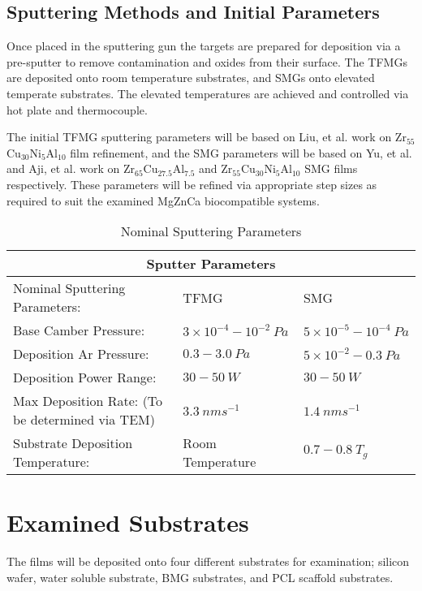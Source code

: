 \documentclass[draft,a4paper,12pt,oneside]{report}%
\begin{document}
\subsection{Sputtering Methods and Initial Parameters}
Once placed in the sputtering gun the targets are prepared for deposition via a pre-sputter to remove contamination and oxides from their surface. The TFMGs are deposited onto room temperature substrates, and SMGs onto elevated temperate substrates. The elevated temperatures are achieved and controlled via hot plate and thermocouple.

The initial TFMG sputtering parameters will be based on Liu, et al. \cite{Liu2012} work on Zr$_{55}$Cu$_{30}$Ni$_{5}$Al$_{10}$ film refinement, and the SMG parameters will be based on Yu, et al. \cite{Yu2013} and Aji, et al. \cite{Aji2013} work on Zr$_{65}$Cu$_{27.5}$Al$_{7.5}$ and Zr$_{55}$Cu$_{30}$Ni$_{5}$Al$_{10}$ SMG films respectively. These parameters will be refined via appropriate step sizes as required to suit the examined MgZnCa biocompatible systems. 

\begin{table}[h]
	\centering
	\begin{tabular}{ l l l }
		\toprule
		\multicolumn{3}{c}{Sputter Parameters}\\
		\midrule
		Nominal Sputtering Parameters: & TFMG & SMG \\
		\midrule
		Base Camber Pressure: & $3 \times 10^{-4} - 10^{-2}~ Pa$ & $5 \times 10^{-5} - 10^{-4}~ Pa$ \\
		Deposition Ar Pressure:	& $0.3 - 3.0~ Pa$ & $5\times 10^{-2} - 0.3~ Pa$\\
		Deposition Power Range:	& $30 - 50~ W$ & $30 - 50~ W$\\
		Max Deposition Rate: (To be determined via TEM) & $3.3~ nm s^{-1}$ & $1.4~ nm s^{-1}$ \\	 
		Substrate Deposition Temperature: & Room Temperature & $0.7 - 0.8~ T_{g}$ \\
		\bottomrule
	\end{tabular}
	\caption{Nominal Sputtering Parameters}
	\label{tab:NomSputterParameters}
\end{table} 	

\section{Examined Substrates} 
The films will be deposited onto four different substrates for examination; silicon wafer, water soluble substrate, BMG substrates, and PCL scaffold substrates.
\end{document}
